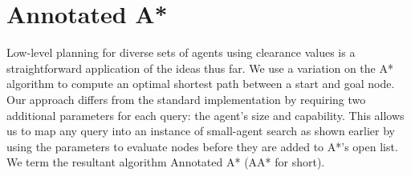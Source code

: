 \section{Annotated A*}
\label{aha:aastar}
Low-level planning for diverse sets of agents using clearance values is a straightforward application of the ideas thus far.
We use a variation on the A* algorithm \cite{astar} to compute an optimal shortest path between a start and goal node.  
Our approach differs from the standard implementation by requiring two additional parameters for each query: the agent's size and capability. This allows us to map any query into an instance of small-agent search as shown earlier by using the parameters to evaluate nodes before they are added to A*'s open list. We term the resultant algorithm Annotated A* (AA* for short).
